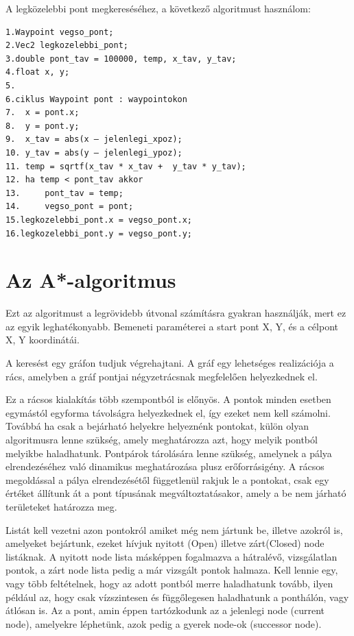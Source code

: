 
A legközelebbi pont megkereséséhez, a következő algoritmust használom:
\begin{verbatim} 
1.Waypoint vegso_pont;
2.Vec2 legkozelebbi_pont;
3.double pont_tav = 100000, temp, x_tav, y_tav;
4.float x, y;
5.
6.ciklus Waypoint pont : waypointokon
7.	x = pont.x;
8.	y = pont.y;
9.	x_tav = abs(x – jelenlegi_xpoz);
10.	y_tav = abs(y – jelenlegi_ypoz);
11.	temp = sqrtf(x_tav * x_tav +  y_tav * y_tav);
12.	ha temp < pont_tav akkor
13.		pont_tav = temp;
14.		vegso_pont = pont;
15.legkozelebbi_pont.x = vegso_pont.x;
16.legkozelebbi_pont.y = vegso_pont.y; 
\end{verbatim}

\section{Az A*-algoritmus}


Ezt az algoritmust a legrövidebb útvonal számításra gyakran használják, mert ez az egyik leghatékonyabb. Bemeneti paraméterei a start pont X, Y, és a célpont X, Y koordinátái. 

A keresést egy gráfon tudjuk végrehajtani. A gráf egy lehetséges realizációja a rács, amelyben a gráf pontjai négyzetrácsnak megfelelően helyezkednek el.

Ez a rácsos kialakítás több szempontból is előnyös. A pontok minden esetben egymástól egyforma távolságra helyezkednek el, így ezeket nem kell számolni. Továbbá ha csak a bejárható helyekre helyeznénk pontokat, külön olyan algoritmusra lenne szükség, amely meghatározza azt, hogy melyik pontból melyikbe haladhatunk. Pontpárok tárolására lenne szükség, amelynek a pálya elrendezéséhez való dinamikus meghatározása plusz erőforrásigény. A rácsos megoldással a pálya elrendezésétől függetlenül rakjuk le a pontokat, csak egy értéket állítunk át a pont típusának megváltoztatásakor, amely a be nem járható területeket határozza meg.

Listát kell vezetni azon pontokról amiket még nem jártunk be, illetve azokról is, amelyeket bejártunk, ezeket hívjuk nyitott (Open) illetve zárt(Closed) node listáknak. A nyitott node lista másképpen fogalmazva a hátralévő, vizsgálatlan pontok, a zárt node lista pedig a már vizsgált pontok halmaza. Kell lennie egy, vagy több feltételnek, hogy az adott pontból merre haladhatunk tovább, ilyen például az, hogy csak vízszintesen és függőlegesen haladhatunk a ponthálón, vagy átlósan is.  Az a pont, amin éppen tartózkodunk az a jelenlegi node (current node), amelyekre léphetünk, azok pedig a gyerek node-ok (successor node).


